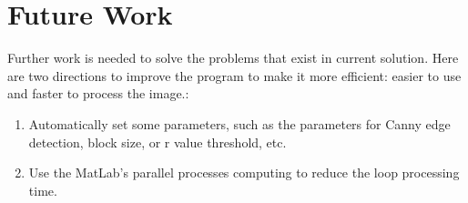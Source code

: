 \chapter{Future Work}

Further work is needed to solve the problems that exist in current solution. Here are two directions to improve the program to make it more efficient: easier to use and faster to process the image.:
\begin{enumerate}
\item Automatically set some parameters, such as the parameters for Canny edge detection, block size, or r value threshold, etc. 
\item Use the MatLab’s parallel processes computing to reduce the loop processing time.
\end{enumerate}